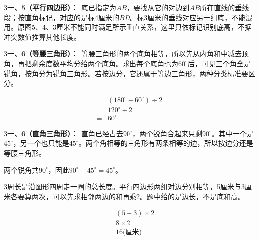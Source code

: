\documentclass[multi=snippet,border={5bp 20bp 5bp 5bp}]{standalone}
\newenvironment{snippet}[3]{\begin{minipage}{#1bp}\color{answerred}\fontsize{#2}{#3}\selectfont\raggedright}{\end{minipage}}
\begin{document}
\begin{snippet}{505}{11.5}{14}\begin{multicols}{3}\raggedcolumns \textbf{一、5（平行四边形）：}\ 底已指定为\(AB\)\allowbreak ，要找从它的对边到\(AB\)\allowbreak 所在直线的垂线段；按直角标记，对应的是标4厘米的\(BD\)\allowbreak 。标3厘米的垂线对应另一组底，不能混用。原图5、4、3厘米不能同时满足所示垂直关系，这里只依标记识别底高，不据冲突数值推算其他长度。\end{multicols}\end{snippet}
\begin{snippet}{505}{11.5}{14}\begin{multicols}{3}\raggedcolumns \textbf{一、6（等腰三角形）：}\ 等腰三角形的两个底角相等，所以先从内角和中减去顶角，再把剩余度数平均分给两个底角。求出每个底角也为\(60^\circ\)\allowbreak 后，可见三个角全是锐角，按角分为锐角三角形。若按边分，它还属于等边三角形，两种分类标准要区分。\par \[\begin{aligned}&(180^\circ-60^\circ)\div2\\={}&120^\circ\div2\\={}&60^\circ\end{aligned}\]\end{multicols}\end{snippet}
\begin{snippet}{505}{11.5}{14}\begin{multicols}{3}\raggedcolumns \textbf{一、6（直角三角形）：}\ 直角已经占去\(90^\circ\)\allowbreak ，两个锐角合起来只剩\(90^\circ\)\allowbreak 。其中一个是\(45^\circ\)\allowbreak ，另一个也只能是\(45^\circ\)\allowbreak 。两个角相等的三角形有两条相等的边，所以按边分还是等腰三角形。\par 两个锐角共\(90^\circ\)\allowbreak ，因此\(90^\circ-45^\circ=45^\circ\)\allowbreak 。\end{multicols}\end{snippet}
\begin{snippet}{505}{11.5}{14}\begin{multicols}{3}\raggedcolumns 周长是沿图形四周走一圈的总长度。平行四边形两组对边分别相等，5厘米与3厘米各要算两次，可以先求相邻两边的和再乘2。题中给的是边长，不是底和高。\par \[\begin{aligned}&(5+3)\times2\\={}&8\times2\\={}&16\text{(厘米)}\end{aligned}\]\end{multicols}\end{snippet}
\end{document}

